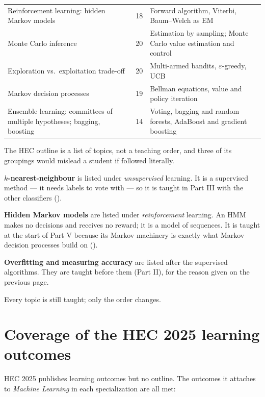 \begin{longtable}{@{}L{6.4cm}L{2.0cm}L{6.6cm}@{}}
Reinforcement learning: hidden Markov models & 18 & Forward algorithm,
Viterbi, Baum--Welch as EM \\
Monte Carlo inference & 20 & Estimation by sampling; Monte Carlo value
estimation and control \\
Exploration vs.\ exploitation trade-off & 20 & Multi-armed bandits,
$\varepsilon$-greedy, UCB \\
Markov decision processes & 19 & Bellman equations, value and policy iteration \\
Ensemble learning: committees of multiple hypotheses; bagging, boosting & 14 &
Voting, bagging and random forests, AdaBoost and gradient boosting \\
\bottomrule
\end{longtable}

\begin{conceptbox}
The HEC outline is a list of topics, not a teaching order, and three of its
groupings would mislead a student if followed literally.
\begin{tight}
  \item \textbf{$k$-nearest-neighbour} is listed under \emph{unsupervised}
        learning. It is a supervised method --- it needs labels to vote with ---
        so it is taught in Part III with the other classifiers ().
  \item \textbf{Hidden Markov models} are listed under \emph{reinforcement}
        learning. An HMM makes no decisions and receives no reward; it is a
        model of sequences. It is taught at the start of Part V because its
        Markov machinery is exactly what Markov decision processes build on
        ().
  \item \textbf{Overfitting and measuring accuracy} are listed after the
        supervised algorithms. They are taught before them (Part II), for the
        reason given on the previous page.
\end{tight}
Every topic is still taught; only the order changes.
\end{conceptbox}

\section*{Coverage of the HEC 2025 learning outcomes}

HEC 2025 publishes learning outcomes but no outline. The outcomes it attaches to
\emph{Machine Learning} in each specialization are all met:

